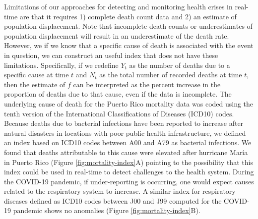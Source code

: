 \documentclass[11pt]{article}
\begin{document}
Limitations of our approaches for detecting and monitoring health crises in real-time are that it requires 1) complete death count data and 2) an estimate of population displacement. Note that incomplete death counts or underestimates of population displacement will result in an underestimate of the death rate. However, we if we know that a specific cause of death is associated with the event in question, we can construct an useful index that does not have these limitations. Specifically,
if we redefine $Y_t$ as the number of deaths due to a specific cause at time $t$ and $N_t$ as the total number of recorded deaths at time $t$, then the estimate of $f$ can be interpreted as the percent increase in the proportion of deaths due to that cause, even if the data is incomplete. The underlying cause of death for the Puerto Rico mortality data was coded using the tenth version of the International Classifications of Diseases (ICD10) codes\cite{world2004icd}. Because deaths due to bacterial infections have been reported to increase after natural disasters in locations with poor public health infrastructure\cite{ligon2006infectious, cook200810th}, we defined an index based on ICD10 codes between A00 and A79 as bacterial infections. We found that deaths attributable to this cause were elevated after hurricane Mar\'ia in Puerto Rico (Figure \ref{fig:mortality-index}A) pointing to the possibility that this index could be used in real-time to detect challenges to the health system. During the COVID-19 pandemic, if under-reporting is occurring, one would expect causes related to the respiratory system to increase. A similar index for respiratory diseases defined as ICD10 codes between J00 and J99 computed for the COVID-19 pandemic shows no anomalies  (Figure \ref{fig:mortality-index}B).
\end{document}
